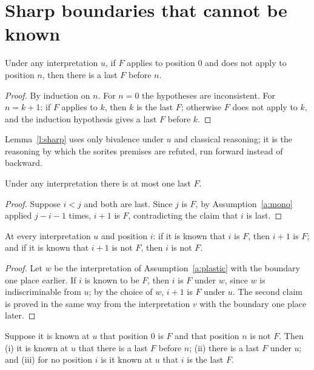 \documentclass{situationist-preprint}
\begin{document}
\section{Sharp boundaries that cannot be known}\label{s:sharp}

\begin{lemma}[Sharpness]\label{l:sharp}
Under any interpretation $u$, if $F$ applies to position $0$ and does not apply to position $n$, then there is a last $F$ before $n$.
\end{lemma}

\begin{proof}
By induction on $n$. For $n = 0$ the hypotheses are inconsistent. For $n = k + 1$: if $F$ applies to $k$, then $k$ is the last $F$; otherwise $F$ does not apply to $k$, and the induction hypothesis gives a last $F$ before $k$.
\end{proof}

Lemma~\ref{l:sharp} uses only bivalence under $u$ and classical reasoning; it is the reasoning by which the sorites premises are refuted, run forward instead of backward.

\begin{lemma}[Uniqueness]\label{l:unique}
Under any interpretation there is at most one last $F$.
\end{lemma}

\begin{proof}
Suppose $i < j$ and both are last. Since $j$ is $F$, by Assumption~\ref{a:mono} applied $j - i - 1$ times, $i + 1$ is $F$, contradicting the claim that $i$ is last.
\end{proof}

\begin{proposition}\label{p:margin}
At every interpretation $u$ and position $i$: if it is known that $i$ is $F$, then $i + 1$ is $F$; and if it is known that $i + 1$ is not $F$, then $i$ is not $F$.
\end{proposition}

\begin{proof}
Let $w$ be the interpretation of Assumption~\ref{a:plastic} with the boundary one place earlier. If $i$ is known to be $F$, then $i$ is $F$ under $w$, since $w$ is indiscriminable from $u$; by the choice of $w$, $i + 1$ is $F$ under $u$. The second claim is proved in the same way from the interpretation $v$ with the boundary one place later.
\end{proof}

\begin{theorem}[Epistemicism]\label{t:main}
Suppose it is known at $u$ that position $0$ is $F$ and that position $n$ is not $F$. Then (i) it is known at $u$ that there is a last $F$ before $n$; (ii) there is a last $F$ under $u$; and (iii) for no position $i$ is it known at $u$ that $i$ is the last $F$.
\end{theorem}
\end{document}

